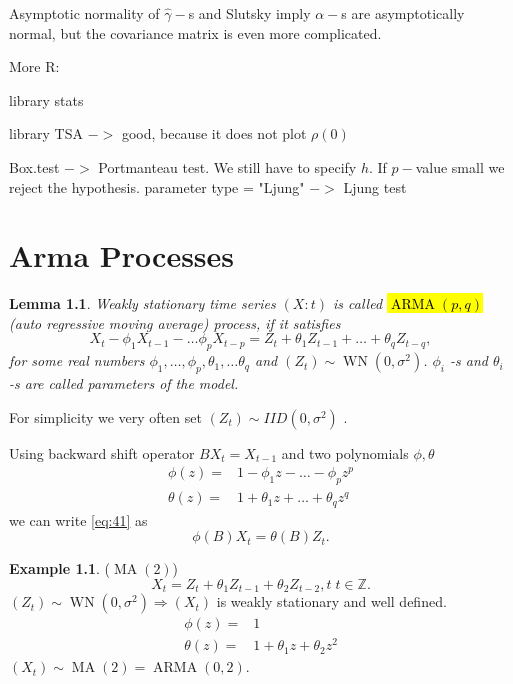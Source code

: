 \documentclass[12pt,a4paper, notitlepage]{book}
\newcommand{\hlc}[2][yellow]{ {\sethlcolor{#1} \hl{#2}} }
\newcommand{\hlcr}[1]{\hlc[lightred]{#1}}
\theoremstyle{definition} %
\newtheorem{example}{Example}[chapter]
\theoremstyle{plain} %
\newtheorem{definition}{Lemma}[chapter]
\newcommand{\Z}{\mathbb Z}
\DeclareMathOperator{\Wn}{WN}
\DeclareMathOperator{\Arma}{ARMA}
\DeclareMathOperator{\Ma}{MA}
\newcommand{\New}[1]{ {\bf \hlcr{#1} } }
\begin{document}
Asymptotic normality of $\hat{\gamma}-$s and Slutsky imply $\alpha -$s are asymptotically normal, but the covariance matrix is even more complicated.  

\vskip1cm

More R:

library stats

library TSA $->$ good, because it does not plot $\rho(0)$

Box.test $->$ Portmanteau test. We still have to specify $h$. If $p-$value small we reject the hypothesis.
parameter type = "Ljung" $->$ Ljung test






\chapter{Arma Processes}

\begin{definition}
Weakly stationary time series $ (X:t) $ is called \New{$ \Arma(p,q)$} (auto regressive moving average) process, if it 
satisfies 
\[ X_t - \phi _1 X_{t-1} - \ldots \phi _p X_{t-p} = Z_t + \theta _1 Z_{t-1} + \ldots + \theta _q Z_{t-q}  , \label{eq:41} \]
for some real numbers $ \phi _1, \ldots , \phi _p, \theta _1, \ldots \theta _q $ and $ (Z_t) \sim \Wn(0, \sigma ^2) $. 
$ \phi _i$ -s and $ \theta _i $ -s are called parameters of the model.
\end{definition}

For simplicity we very often set $ (Z_t) \sim IID(0, \sigma ^2) $ .

Using backward shift operator $ B X_t = X_{t-1} $ and two polynomials $ \phi , \theta $
\begin{align*}
\phi(z) = & 1 - \phi _1 z - \ldots - \phi _p z^p \\
\theta (z) = & 1 + \theta _1 z + \ldots + \theta_q z^q \end{align*}
we can write \ref{eq:41} as 
\[ \phi (B) X_t = \theta(B) Z_t . \]

\begin{example} ($\Ma(2) $)
\[ X_t = Z_t + \theta_1 Z_{t-1} + \theta_2 Z_{t-2} , t\; t \in \Z . \]
$(Z_t) \sim \Wn(0, \sigma ^2) \Rightarrow (X_t) $ is weakly stationary and well defined.
\begin{align*} 
\phi(z) = & 1 \\
\theta (z) = & 1 + \theta _1 z + \theta_2 z^2 
\end{align*}
$ (X_t) \sim \Ma(2) = \Arma(0,2) $.
\end{example}
\end{document}
